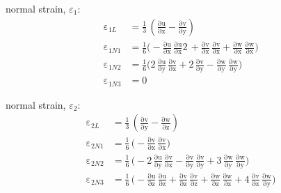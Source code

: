 normal strain, $\varepsilon_1$:
\begin{subequations}
	\begin{align}
	\mathrm \varepsilon_{1L} & = \frac{1}{3} \, \left(\mathrm{\frac{\partial u}{\partial x}} - \mathrm{\frac{\partial v}{\partial y}}\right)\\
	\mathrm \varepsilon_{1N1} & = \frac{1}{6}\Big( - \mathrm{\frac{\partial u}{\partial x}}\, \mathrm{\frac{\partial u}{\partial x}}2 \, + \mathrm{\frac{\partial v}{\partial x}}\, \mathrm{\frac{\partial v}{\partial x}} +  \mathrm{\frac{\partial w}{\partial x}}\, \mathrm{\frac{\partial w}{\partial x}}\Big)\\
	\mathrm \varepsilon_{1N2} & = \frac{1}{6}\Big(2 \, \mathrm{\frac{\partial u}{\partial y}}\, \mathrm{\frac{\partial v}{\partial x}}+ 2\,\mathrm{\frac{ \partial v}{\partial y}}-  \mathrm{\frac{\partial w}{\partial y}}\, \mathrm{\frac{\partial w}{\partial y}}\Big)\\
	\mathrm \varepsilon_{1N3} & = 0
	\end{align}
\end{subequations}

normal strain, $\varepsilon_2$:
\begin{subequations}
	\begin{align}
	\mathrm \varepsilon_{2L} & = \frac{1}{3} \, \left(\mathrm{\frac{\partial v}{\partial y}} - \mathrm{\frac{\partial w}{\partial z}}\right)\\
	\mathrm \varepsilon_{2N1} & = \frac{1}{6} \, \Big(- \mathrm{\frac{\partial v}{\partial x}}\, \mathrm{\frac{\partial v}{\partial x}}\Big)\\
	\mathrm \varepsilon_{2N2} & = \frac{1}{6} \, \Big( - 2 \, \mathrm{\frac{\partial u}{\partial y}}\, \mathrm{\frac{\partial v}{\partial x}} - \mathrm{\frac{ \partial v}{\partial y}}\, \mathrm{\frac{ \partial v}{\partial y}}+ 3 \,  \mathrm{\frac{\partial w}{\partial y}}\, \mathrm{\frac{\partial w}{\partial y}}\Big)\\
	\mathrm \varepsilon_{2N3} & = \frac{1}{6} \, \Big(	 - \mathrm{\frac{\partial u}{\partial z}}\, \mathrm{\frac{\partial u}{\partial z}} + \mathrm{\frac{\partial v}{\partial z}}\, \mathrm{\frac{\partial v}{\partial z}}  +  \mathrm{\frac{\partial w}{\partial z}}\, \mathrm{\frac{\partial w}{\partial z}} + 4 \, \mathrm{\frac{\partial v}{\partial z}}\, \mathrm{\frac{\partial w}{\partial y}}\Big)
	\end{align}
\end{subequations}

